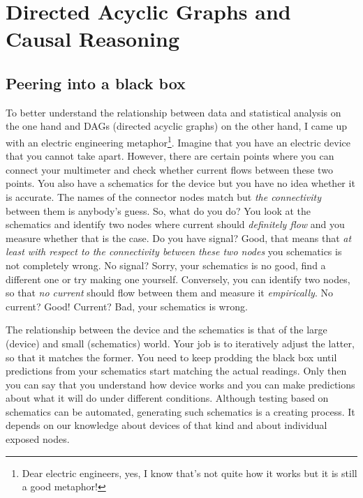 \documentclass[
]{book}
\begin{document}
\hypertarget{directed-acyclic-graphs-and-causal-reasoning}{%
\chapter{Directed Acyclic Graphs and Causal Reasoning}\label{directed-acyclic-graphs-and-causal-reasoning}}

\hypertarget{peering-into-a-black-box}{%
\section{Peering into a black box}\label{peering-into-a-black-box}}

To better understand the relationship between data and statistical analysis on the one hand and DAGs (directed acyclic graphs) on the other hand, I came up with an electric engineering metaphor\footnote{Dear electric engineers, yes, I know that's not quite how it works but it is still a good metaphor!}. Imagine that you have an electric device that you cannot take apart. However, there are certain points where you can connect your multimeter and check whether current flows between these two points. You also have a schematics for the device but you have no idea whether it is accurate. The names of the connector nodes match but \emph{the connectivity} between them is anybody's guess. So, what do you do? You look at the schematics and identify two nodes where current should \emph{definitely flow} and you measure whether that is the case. Do you have signal? Good, that means that \emph{at least with respect to the connectivity between these two nodes} you schematics is not completely wrong. No signal? Sorry, your schematics is no good, find a different one or try making one yourself. Conversely, you can identify two nodes, so that \emph{no current} should flow between them and measure it \emph{empirically}. No current? Good! Current? Bad, your schematics is wrong.

The relationship between the device and the schematics is that of the large (device) and small (schematics) world. Your job is to iteratively adjust the latter, so that it matches the former. You need to keep prodding the black box until predictions from your schematics start matching the actual readings. Only then you can say that you understand how device works and you can make predictions about what it will do under different conditions. Although testing based on schematics can be automated, generating such schematics is a creating process. It depends on our knowledge about devices of that kind and about individual exposed nodes.
\end{document}
